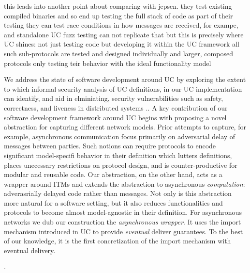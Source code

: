 this leads into another point about comparing with jepsen. they test existing compiled binaries and so end up testing the full stack of code as part of their testing
they can test race conditions in how messages are received, for exampe, and standalone UC fuzz testing can not replicate that
but this is precisely where UC shines: not just testing code but developing it within the UC framework all such sub-protocols are tested and designed individually and larger, composed protocols only testing teir behavior with the ideal functionality model 



We address the state of software development around UC by exploring the extent to which informal security analysis of UC definitions, in our UC implementation can identify, and aid in elminiating, security vulnerabilities such as safety, correctness, and liveness in distributed systems ..  
A key contribution of our software development framework around UC begins with proposing a novel abstraction for capturing different network models.
Prior attempts to capture, for example, asynchronous communication focus primarily on adversarial delay of messages between parties. 
Such notions can require protocols to encode significant model-specifi behavior in their definition which lutters definitions, places unecessary restrictions on protocol design, and is counter-productive for modular and reusable code. 
Our abstraction, on the other hand, acts as a wrapper around ITMs and extends the abstraction to asynchronous \emph{computation}: adverasrially delayed code rather than messages.  
Not only is this abstraction more natural for a software setting, but it also reduces functionalities and protocols to become almost model-agnostic in their definition. 
For asynchronous networks we dub our construction the \emph{asynchronous wrapper}. 
It uses the import mechanism introduced in UC to provide \emph{eventual} deliver guarantees.
To the best of our knowledge, it is the first concretization of the import mechanism with eventual delivery. 



.

